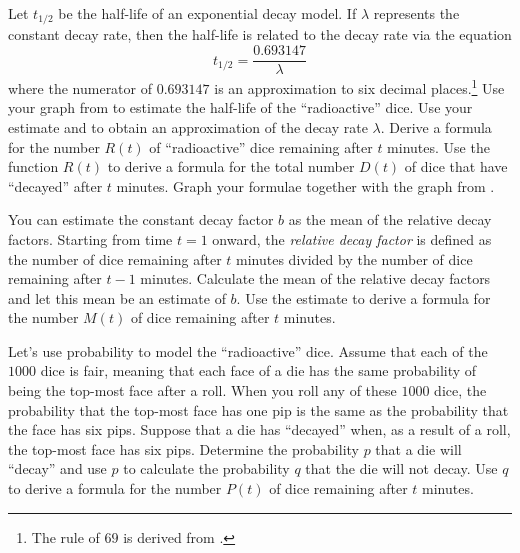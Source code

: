 \documentclass[a4paper,oneside,12pt]{article}
\begin{document}
\begin{problem}
\begin{packedenum}
  \item\label{subprob:exponential:radioactive_dice_decay_constant}
    Let $t_{1/2}$ be the half-life of an exponential decay model.  If
    $\lambda$ represents the constant decay rate, then the half-life
    is related to the decay rate via the equation
    \begin{equation}
    \label{eqn:exponential:half_life_related_to_decay_rate}
    t_{1/2}
    =
    \frac{0.693147}{\lambda}
    \end{equation}
    where the numerator of $0.693147$ is an approximation to six
    decimal places.\footnote{
      The rule of $69$ is derived from
      .
    }
    Use your graph
    from 
    to estimate the half-life of the ``radioactive'' dice.  Use your
    estimate and
     to
    obtain an approximation of the decay rate $\lambda$.  Derive a
    formula for the number $R(t)$ of ``radioactive'' dice remaining
    after $t$ minutes.  Use the function $R(t)$ to derive a formula
    for the total number $D(t)$ of dice that have ``decayed'' after
    $t$ minutes.  Graph your formulae together with the graph
    from .

  \item\label{subprob:exponential:radioactive_dice_mean_decay_rate}
    You can estimate the constant decay factor $b$ as the mean of the
    relative decay factors.  Starting from time $t = 1$ onward, the
    \emph{relative decay factor} is defined as the number of dice
    remaining after $t$ minutes divided by the number of dice
    remaining after $t - 1$ minutes.  Calculate the mean of the
    relative decay factors and let this mean be an estimate of $b$.
    Use the estimate to derive a formula for the number  $M(t)$ of
    dice remaining after $t$ minutes.

  \item\label{subprob:exponential:radioactive_dice_probability}
    Let's use probability to model the ``radioactive'' dice.  Assume
    that each of the $1000$ dice is fair, meaning that each face of a
    die has the same probability of being the top-most face after a
    roll.  When you roll any of these $1000$ dice, the probability
    that the top-most face has one pip is the same as the probability
    that the face has six pips.  Suppose that a die has ``decayed''
    when, as a result of a roll, the top-most face has six pips.
    Determine the probability $p$ that a die will ``decay'' and use
    $p$ to calculate the probability $q$ that the die will not decay.
    Use $q$ to derive a formula for the number $P(t)$ of dice
    remaining after $t$ minutes.


\end{packedenum}
\end{problem}
\end{document}
